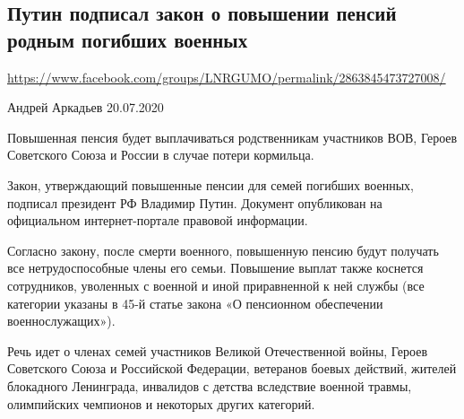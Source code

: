  
 
\subsection{Путин подписал закон о повышении пенсий родным погибших военных}
\label{sec:21_07_2020.fb.lnr.12}
\url{https://www.facebook.com/groups/LNRGUMO/permalink/2863845473727008/}


Андрей Аркадьев
20.07.2020

Повышенная пенсия будет выплачиваться родственникам участников ВОВ, Героев
Советского Союза и России в случае потери кормильца.

Закон, утверждающий повышенные пенсии для семей погибших военных, подписал
президент РФ Владимир Путин. Документ опубликован на официальном
интернет-портале правовой информации.

Согласно закону, после смерти военного, повышенную пенсию будут получать все
нетрудоспособные члены его семьи.  Повышение выплат также коснется сотрудников,
уволенных с военной и иной приравненной к ней службы (все категории указаны в
45-й статье закона «О пенсионном обеспечении военнослужащих»).

Речь идет о членах семей участников Великой Отечественной войны, Героев
Советского Союза и Российской Федерации, ветеранов боевых действий, жителей
блокадного Ленинграда, инвалидов с детства вследствие военной травмы,
олимпийских чемпионов и некоторых других категорий.
  
